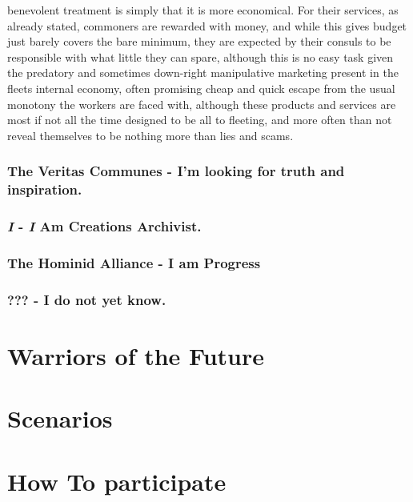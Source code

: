 \documentclass[a4paper,12pt]{report}
\begin{document}
benevolent treatment is simply that it is more economical. For their services, as already stated, commoners are rewarded with money, and while this gives budget just barely covers the bare minimum, they are expected by their consuls to be responsible with what little they can spare, although this is no easy task given the predatory and sometimes down-right manipulative marketing present in the fleets internal economy, often promising cheap and quick escape from the usual monotony the workers are faced with, although these products and services are most if not all the time designed to be all to fleeting, and more often than not reveal themselves to be nothing more than lies and scams. 
\subsection{The  Veritas Communes - I'm looking for truth and inspiration. }

\subsection{\textit{I} - \textit{I} Am Creations Archivist.}

\subsection{The Hominid Alliance - I am Progress}

\subsection{??? - I do not yet know.}

\chapter{Warriors of the Future}

\chapter{Scenarios}

\chapter{How To participate}
\end{document}
